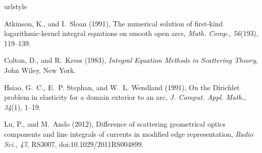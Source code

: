 \documentclass[draft,grl]{AGUTeX}
\begin{document}
\begin{article}





\begin{thebibliography}{}

\providecommand{\natexlab}[1]{#1}
\expandafter\ifx\csname urlstyle\endcsname\relax
  \providecommand{\doi}[1]{doi:\discretionary{}{}{}#1}\else
  \providecommand{\doi}{doi:\discretionary{}{}{}\begingroup
  \urlstyle{rm}\Url}\fi

Atkinson, K., and I.~Sloan (1991), The numerical solution of first-kind
  logarithmic-kernel integral equations on smooth open arcs, \textit{Math.
  Comp.}, \textit{56}(193), 119--139.

Colton, D., and R.~Kress (1983), \textit{Integral Equation Methods in
  Scattering Theory}, John Wiley, New York.

Hsiao, G.~C., E.~P. Stephan, and W.~L. Wendland (1991), On the {D}irichlet
  problem in elasticity for a domain exterior to an arc, \textit{J. Comput.
  Appl. Math.}, \textit{34}(1), 1--19.

Lu, P., and M.~Ando (2012), Difference of scattering geometrical optics
  components and line integrals of currents in modified edge representation,
  \textit{Radio Sci.}, \textit{47},  RS3007, \doi{10.1029/2011RS004899}.

\end{thebibliography}




\end{article}
\end{document}
